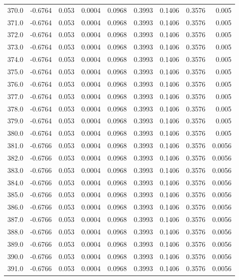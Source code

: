 \begin{longtable}{lrrrrrrrr}
370.0 & -0.6764 & 0.053 & 0.0004 & 0.0968 & 0.3993 & 0.1406 & 0.3576 & 0.005 \\
371.0 & -0.6764 & 0.053 & 0.0004 & 0.0968 & 0.3993 & 0.1406 & 0.3576 & 0.005 \\
372.0 & -0.6764 & 0.053 & 0.0004 & 0.0968 & 0.3993 & 0.1406 & 0.3576 & 0.005 \\
373.0 & -0.6764 & 0.053 & 0.0004 & 0.0968 & 0.3993 & 0.1406 & 0.3576 & 0.005 \\
374.0 & -0.6764 & 0.053 & 0.0004 & 0.0968 & 0.3993 & 0.1406 & 0.3576 & 0.005 \\
375.0 & -0.6764 & 0.053 & 0.0004 & 0.0968 & 0.3993 & 0.1406 & 0.3576 & 0.005 \\
376.0 & -0.6764 & 0.053 & 0.0004 & 0.0968 & 0.3993 & 0.1406 & 0.3576 & 0.005 \\
377.0 & -0.6764 & 0.053 & 0.0004 & 0.0968 & 0.3993 & 0.1406 & 0.3576 & 0.005 \\
378.0 & -0.6764 & 0.053 & 0.0004 & 0.0968 & 0.3993 & 0.1406 & 0.3576 & 0.005 \\
379.0 & -0.6764 & 0.053 & 0.0004 & 0.0968 & 0.3993 & 0.1406 & 0.3576 & 0.005 \\
380.0 & -0.6764 & 0.053 & 0.0004 & 0.0968 & 0.3993 & 0.1406 & 0.3576 & 0.005 \\
381.0 & -0.6766 & 0.053 & 0.0004 & 0.0968 & 0.3993 & 0.1406 & 0.3576 & 0.0056 \\
382.0 & -0.6766 & 0.053 & 0.0004 & 0.0968 & 0.3993 & 0.1406 & 0.3576 & 0.0056 \\
383.0 & -0.6766 & 0.053 & 0.0004 & 0.0968 & 0.3993 & 0.1406 & 0.3576 & 0.0056 \\
384.0 & -0.6766 & 0.053 & 0.0004 & 0.0968 & 0.3993 & 0.1406 & 0.3576 & 0.0056 \\
385.0 & -0.6766 & 0.053 & 0.0004 & 0.0968 & 0.3993 & 0.1406 & 0.3576 & 0.0056 \\
386.0 & -0.6766 & 0.053 & 0.0004 & 0.0968 & 0.3993 & 0.1406 & 0.3576 & 0.0056 \\
387.0 & -0.6766 & 0.053 & 0.0004 & 0.0968 & 0.3993 & 0.1406 & 0.3576 & 0.0056 \\
388.0 & -0.6766 & 0.053 & 0.0004 & 0.0968 & 0.3993 & 0.1406 & 0.3576 & 0.0056 \\
389.0 & -0.6766 & 0.053 & 0.0004 & 0.0968 & 0.3993 & 0.1406 & 0.3576 & 0.0056 \\
390.0 & -0.6766 & 0.053 & 0.0004 & 0.0968 & 0.3993 & 0.1406 & 0.3576 & 0.0056 \\
391.0 & -0.6766 & 0.053 & 0.0004 & 0.0968 & 0.3993 & 0.1406 & 0.3576 & 0.0056 \\

\end{longtable}
